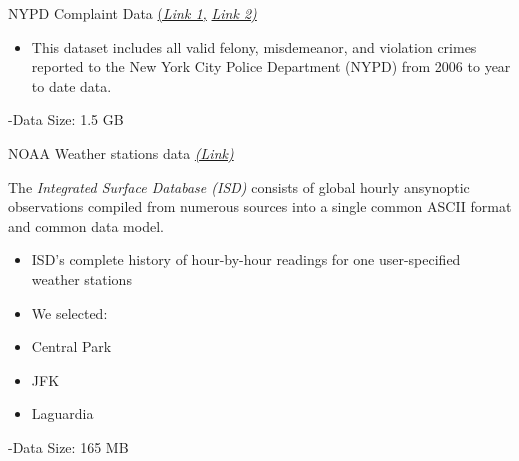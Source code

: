 \documentclass[10pt,ignorenonframetext,]{beamer}
\providecommand{\tightlist}{%
  \setlength{\itemsep}{0pt}\setlength{\parskip}{0pt}}
\begin{document}
\begin{frame}

\begin{block}{NYPD Complaint Data
\href{https://data.cityofnewyork.us/Public-Safety/NYPD-Complaint-Data-Historic/qgea-i56i}{(\emph{Link
1,}}
\href{https://data.cityofnewyork.us/Public-Safety/NYPD-Complaint-Data-Current-YTD/5uac-w243}{\emph{Link
2)}}}

\begin{itemize}
\tightlist
\item
  This dataset includes all valid felony, misdemeanor, and violation
  crimes reported to the New York City Police Department (NYPD) from
  2006 to year to date data.
\end{itemize}

-Data Size: 1.5 GB

\end{block}

\begin{block}{NOAA Weather stations data
\href{https://www.ncdc.noaa.gov/isd}{\emph{(Link)}}}

The \emph{Integrated Surface Database (ISD)} consists of global hourly
ansynoptic observations compiled from numerous sources into a single
common ASCII format and common data model.

\begin{itemize}
\item
  ISD's complete history of hour-by-hour readings for one user-specified
  weather stations
\item
  We selected:
\item
  Central Park
\item
  JFK
\item
  Laguardia
\end{itemize}

-Data Size: 165 MB

\end{block}

\end{frame}
\end{document}
